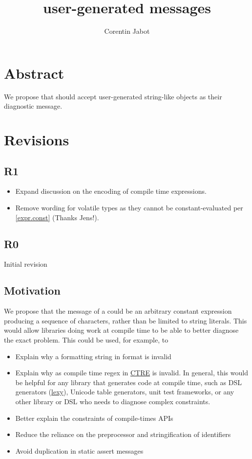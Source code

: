 \documentclass{wg21}
\title{user-generated \tcode{static\_assert} messages}
\author{Corentin Jabot}{corentin.jabot@gmail.com}
\begin{document}
\maketitle

\section{Abstract}

We propose that  should accept user-generated string-like objects as their diagnostic message.

\section{Revisions}

\subsection{R1}

\begin{itemize}
 \item Expand discussion on the encoding of compile time expressions.
 \item Remove wording for volatile types as they cannot be constant-evaluated per \href{https://eel.is/c++draft/expr.const#5.9}{[expr.const]} (Thanks Jens!).
\end{itemize}


\subsection{R0}

Initial revision

\subsection{Motivation}

We propose that the message of a  could be an arbitrary constant expression producing a sequence of characters,
rather than be limited to string literals.
This would allow libraries doing work at compile time to be able to better diagnose the exact problem.
This could be used, for example, to
\begin{itemize}
    \item Explain why a formatting string in format is invalid
    \item Explain why as compile time regex in \href{https://github.com/hanickadot/compile-time-regular-expressions}{CTRE} is invalid. In general, this would be helpful for any library that generates code at compile time, such as DSL generators (\href{https://github.com/foonathan/lexy}{lexy}), Unicode table generators, unit test frameworks, or any other library or DSL who needs to diagnose complex constraints.
    \item Better explain the constraints of compile-times APIs
    \item Reduce the reliance on the preprocessor and stringification of identifiers
    \item Avoid duplication in static assert messages
\end{itemize}
\end{document}
